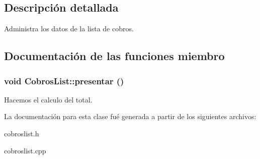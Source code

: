 \subsection{Descripci\'{o}n detallada}
Administra los datos de la lista de cobros. 



\subsection{Documentaci\'{o}n de las funciones miembro}
\subsubsection{\setlength{\rightskip}{0pt plus 5cm}void Cobros\-List::presentar ()}\label{classCobrosList_a12}


Hacemos el calculo del total. 

La documentaci\'{o}n para esta clase fu\'{e} generada a partir de los siguientes archivos:\begin{CompactItemize}
\item 
cobroslist.h\item 
cobroslist.cpp\end{CompactItemize}
